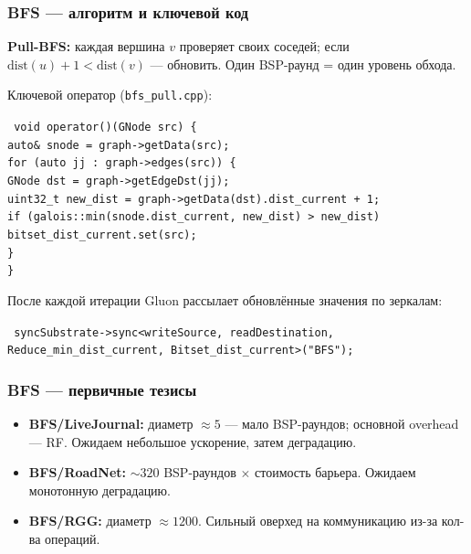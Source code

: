 \documentclass[aspectratio=169]{beamer}
\begin{document}
\begin{frame}
  \frametitle{BFS --- алгоритм и ключевой код}

  \textbf{Pull-BFS:} каждая вершина $v$ проверяет своих соседей;
  если $\mathrm{dist}(u)+1 < \mathrm{dist}(v)$ --- обновить.
  Один BSP-раунд = один уровень обхода.

  \medskip
  {\small Ключевой оператор (\texttt{bfs\_pull.cpp}):}
  \begin{exampleblock}{}
  \vspace{-4pt}
  {\scriptsize\tt
  \hspace{1em}void operator()(GNode src) \{\\
  \hspace{2em}auto\& snode = graph->getData(src);\\
  \hspace{2em}for (auto jj : graph->edges(src)) \{\\
  \hspace{3em}GNode dst = graph->getEdgeDst(jj);\\
  \hspace{3em}uint32\_t new\_dist = graph->getData(dst).dist\_current + 1;\\
  \hspace{3em}if (galois::min(snode.dist\_current, new\_dist) > new\_dist)\\
  \hspace{4em}bitset\_dist\_current.set(src);\\
  \hspace{2em}\}\\
  \hspace{1em}\}
  }
  \vspace{-4pt}
  \end{exampleblock}

  После каждой итерации Gluon рассылает обновлённые значения по зеркалам:

  {\scriptsize\tt
  syncSubstrate->sync<writeSource, readDestination,
    Reduce\_min\_dist\_current, Bitset\_dist\_current>("BFS");
  }
\end{frame}

\begin{frame}
  \frametitle{BFS --- первичные тезисы}

  \begin{itemize}
    \item \textbf{BFS/LiveJournal:} диаметр $\approx 5$ ---
          мало BSP-раундов; основной overhead --- RF.
          Ожидаем небольшое ускорение, затем деградацию.

    \item \textbf{BFS/RoadNet:} $\sim 320$ BSP-раундов $\times$ стоимость барьера.
          Ожидаем монотонную деградацию.

    \item \textbf{BFS/RGG:}
          диаметр $\approx 1200$. Сильный оверхед на коммуникацию из-за кол-ва операций.
  \end{itemize}
\end{frame}
\end{document}

